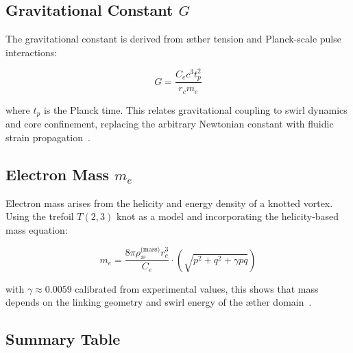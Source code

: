 \documentclass[preprint]{revtex4-2}
\begin{document}
            \subsection{Gravitational Constant \boldmath\( G \)}
            The gravitational constant is derived from æther tension and Planck-scale pulse interactions:
        
            \begin{equation}
                G = \frac{C_e c^3 t_p^2}{r_c m_e}
            \label{eq:gravity_vam}
            \end{equation}
        
            where \( t_p \) is the Planck time. This relates gravitational coupling to swirl dynamics and core confinement, replacing the arbitrary Newtonian constant with fluidic strain propagation~\cite{volovik2003universe}.
        
            \subsection{Electron Mass \boldmath\( m_e \)}
            Electron mass arises from the helicity and energy density of a knotted vortex. Using the trefoil \( T(2,3) \) knot as a model and incorporating the helicity-based mass equation:
        
            \begin{equation}
                m_e = \frac{8\pi \rho_{\text{\ae}}^\text{(mass)} r_c^3}{C_e} \cdot \left( \sqrt{p^2 + q^2 + \gamma pq} \right)
            \label{eq:electron_mass_vam}
            \end{equation}
        
            with \( \gamma \approx 0.0059 \) calibrated from experimental values, this shows that mass depends on the linking geometry and swirl energy of the æther domain~\cite{kleckner2013knots, moffatt1969knottedness}.
        
            \subsection*{Summary Table}
        
\end{document}
